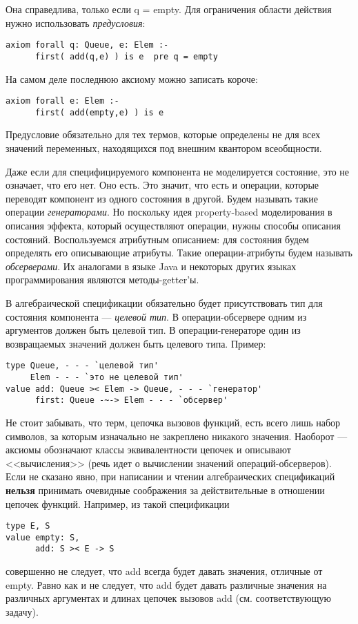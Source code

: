 Она справедлива, только если q = empty. Для ограничения области действия нужно использовать \emph{предусловия}:
\begin{lstlisting}
axiom forall q: Queue, e: Elem :-
      first( add(q,e) ) is e  pre q = empty
\end{lstlisting}

На самом деле последнюю аксиому можно записать короче:
\begin{lstlisting}
axiom forall e: Elem :-
      first( add(empty,e) ) is e
\end{lstlisting}

Предусловие обязательно для тех термов, которые определены не для всех значений переменных, находящихся под внешним квантором всеобщности.


Даже если для специфицируемого компонента не моделируется состояние, это не означает, что его нет. Оно есть. Это значит, что есть и операции, которые переводят компонент из одного состояния в другой. Будем называть такие операции \emph{генераторами}. Но поскольку идея property-based моделирования в описания эффекта, который осуществляют операции, нужны способы описания состояний. Воспользуемся атрибутным описанием: для состояния будем определять его описывающие атрибуты. Такие операции-атрибуты будем называть \emph{обсерверами}. Их аналогами в языке Java и некоторых других языках программирования являются методы-getter'ы.

В алгебраической спецификации обязательно будет присутствовать тип для состояния компонента --- \emph{целевой тип}. В операции-обсервере одним из аргументов должен быть целевой тип. В операции-генераторе один из возвращаемых значений должен быть целевого типа. Пример:
\begin{lstlisting}[escapeinside=`']
type Queue, - - - `целевой тип'
     Elem - - - `это не целевой тип'
value add: Queue >< Elem -> Queue, - - - `генератор'
      first: Queue -~-> Elem - - - `обсервер'
\end{lstlisting}




Не стоит забывать, что терм, цепочка вызовов функций, есть всего лишь набор символов, за которым изначально не закреплено никакого значения. Наоборот --- аксиомы обозначают классы эквивалентности цепочек и описывают <<вычисления>> (речь идет о вычислении значений операций-обсерверов). Если не сказано явно, при написании и чтении алгебраических спецификаций \textbf{нельзя} принимать очевидные соображения за действительные в отношении цепочек функций. Например, из такой спецификации
\begin{lstlisting}
type E, S
value empty: S,
      add: S >< E -> S
\end{lstlisting}
совершенно не следует, что add всегда будет давать значения, отличные от empty. Равно как и не следует, что add будет давать различные значения на различных аргументах и длинах цепочек вызовов add (см. соответствующую задачу).

